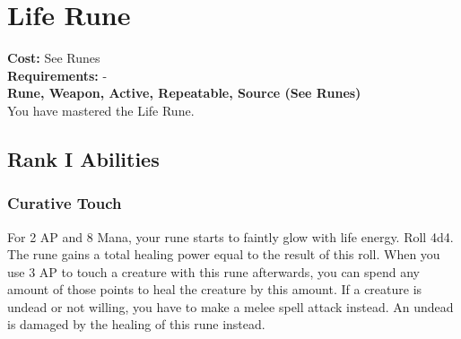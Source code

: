 \section{Life Rune}\label{rune:life}
\textbf{Cost:} See Runes\\
\textbf{Requirements:} -\\
\textbf{Rune, Weapon, Active, Repeatable, Source (See Runes)}\\
You have mastered the Life Rune.

\subsection{Rank I Abilities}

\subsubsection{Curative Touch}
For 2 AP and 8 Mana, your rune starts to faintly glow with life energy.
Roll 4d4.
The rune gains a total healing power equal to the result of this roll.
When you use 3 AP to touch a creature with this rune afterwards, you can spend any amount of those points to heal the creature by this amount.
If a creature is undead or not willing, you have to make a melee spell attack instead.
An undead is damaged by the healing of this rune instead.